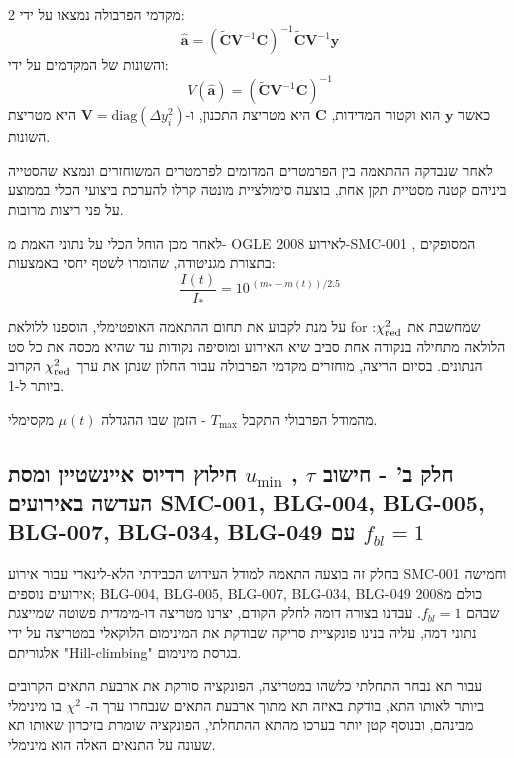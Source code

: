 \documentclass{article}
\begin{document}
\begin{multicols}{2}
מקדמי הפרבולה נמצאו על ידי:
\begin{equation}
    \hat{\mathbf{a}} = \left(\tilde{\mathbf{C}}\mathbf{V}^{-1}\mathbf{C}\right)^{-1}
    \tilde{\mathbf{C}}\mathbf{V}^{-1}\mathbf{y}
\end{equation}
והשונות של המקדמים על ידי:
\begin{equation}
    V(\hat{\mathbf{a}}) = \left(\tilde{\mathbf{C}}\mathbf{V}^{-1}\mathbf{C}\right)^{-1}
\end{equation}
כאשר $\mathbf{y}$ הוא וקטור המדידות, $\mathbf{C}$ היא מטריצת התכנון, ו-$\mathbf{V} = \mathrm{diag}(\Delta y_i^2)$ היא מטריצת השונות.

לאחר שנבדקה ההתאמה בין הפרמטרים המדומים לפרמטרים המשוחזרים ונמצא שהסטייה ביניהם קטנה מסטיית תקן אחת, בוצעה סימולציית מונטה קרלו להערכת ביצועי הכלי בממוצע על פני ריצות מרובות.

לאחר מכן הוחל הכלי על נתוני האמת מ-
OGLE 
לאירוע
2008-SMC-001 
\cite{ogle2008smc001}, 
המסופקים בתצורת מגניטודה,
שהומרו לשטף יחסי באמצעות:
\begin{equation}
    \frac{I(t)}{I_*} = 10^{\,(m_* - m(t))/2.5}
\end{equation}



על מנת לקבוע את תחום ההתאמה האופטימלי, הוספנו ללולאת 
\textenglish{for}
שמחשבת את 
$\chi^2_{\rm red}$:
הלולאה מתחילה בנקודה אחת סביב שיא האירוע ומוסיפה נקודות עד שהיא מכסה את כל סט הנתונים.
בסיום הריצה, מוחזרים מקדמי הפרבולה עבור החלון שנתן את ערך 
$\chi^2_{\rm red}$
הקרוב ביותר ל-1.

מהמודל הפרבולי התקבל 
$T_{\max}$
- הזמן שבו ההגדלה 
$\mu(t)$
מקסימלי.


\subsection{חלק ב'
-
חישוב
$\tau$
,
$u_{\min}$
חילוץ רדיוס איינשטיין ומסת העדשה
באירועים
\mbox{SMC-001},
\mbox{BLG-004},
\mbox{BLG-005},
\mbox{BLG-007},
\mbox{BLG-034},
\mbox{BLG-049}
עם
$f_{bl}=1$
}
\label{sec:part2.2}

בחלק זה בוצעה התאמה למודל העידוש הכבידתי הלא-לינארי עבור אירוע
\mbox{SMC-001}
וחמישה אירועים נוספים;
\mbox{BLG-004},
\mbox{BLG-005},
\mbox{BLG-007},
\mbox{BLG-034},
\mbox{BLG-049}
כולם מ2008
שבהם
$f_{bl}=1$.
עבדנו בצורה דומה לחלק הקודם, 
יצרנו מטריצה דו-מימדית פשוטה 
שמייצגת נתוני דמה,
עליה בנינו פונקציית סריקה שבודקת את המינימום הלוקאלי במטריצה על ידי 
אלגוריתם
"\textenglish{Hill-climbing}"
בגרסת מינימום.

עבור תא נבחר התחלתי כלשהו במטריצה,
הפונקציה סורקת את ארבעת התאים הקרובים ביותר לאותו התא,
בודקת באיזה תא מתוך ארבעת התאים שנבחרו ערך
ה-
$\chi^2$
בו
מינימלי מבינהם,
ובנוסף קטן יותר בערכו מהתא ההתחלתי,
 הפונקציה שומרת בזיכרון שאותו תא שעונה על התנאים האלה הוא מינימלי.
 

\end{multicols}
\end{document}
